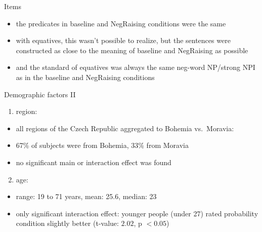 \documentclass[
  ignorenonframetext,
]{beamer}
\providecommand{\tightlist}{%
  \setlength{\itemsep}{0pt}\setlength{\parskip}{0pt}}\usepackage{longtable,booktabs,array}
\begin{document}
\begin{frame}
\begin{block}{Items}
\protect\hypertarget{items}{}
\begin{itemize}
\tightlist
\item
  the predicates in baseline and NegRaising conditions were the same
\item
  with equatives, this wasn't possible to realize, but the sentences
  were constructed as close to the meaning of baseline and NegRaising as
  possible
\item
  and the standard of equatives was always the same neg-word NP/strong
  NPI as in the baseline and NegRaising conditions
\end{itemize}
\end{block}
\end{frame}

\begin{frame}
\end{frame}

\begin{frame}
\begin{block}{Demographic factors II}
\protect\hypertarget{demographic-factors-ii}{}
\begin{enumerate}
\tightlist
\item
  region:
\end{enumerate}

\begin{itemize}
\tightlist
\item
  all regions of the Czech Republic aggregated to Bohemia vs.~Moravia:
\item
  67\% of subjects were from Bohemia, 33\% from Moravia
\item
  no significant main or interaction effect was found
\end{itemize}

\begin{enumerate}
\setcounter{enumi}{1}
\tightlist
\item
  age:
\end{enumerate}

\begin{itemize}
\tightlist
\item
  range: 19 to 71 years, mean: 25.6, median: 23
\item
  only significant interaction effect: younger people (under 27) rated
  probability condition slightly better (t-value: \(2.02\), p
  \(< 0.05\))
\end{itemize}
\end{block}
\end{frame}
\end{document}
